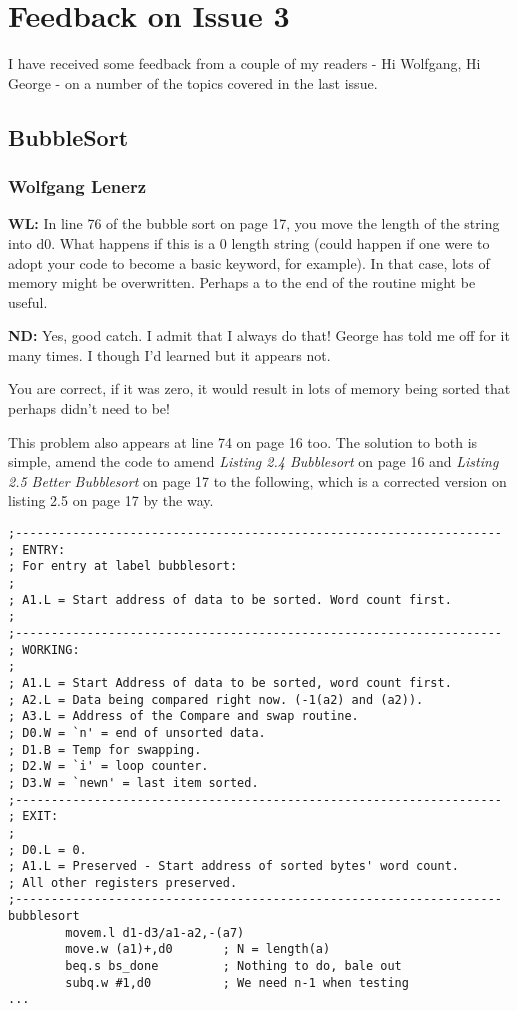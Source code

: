 \chapter{Feedback on Issue 3}
I have received some feedback from a couple of my readers - Hi Wolfgang, Hi George - on a number of the topics covered in the last issue.

\section{BubbleSort}

\subsection{Wolfgang Lenerz}

\textbf{WL: }In line 76 of the bubble sort on page 17, you move the length of the string into d0. What happens if this is a 0 length string (could happen
if one were to adopt your code to become a basic keyword, for example). In that case, lots of memory might be overwritten. Perhaps a  to the
end of the routine might be useful.

\textbf{ND: }Yes, good catch. I admit that I always do that! George has told me off for it many times. I though I'd learned but it appears not.

You are correct, if it was zero, it would result in lots of memory being sorted that perhaps didn't need to be!

This problem also appears at line 74 on page 16 too. The solution to both is simple, amend the code to amend \emph{Listing 2.4 Bubblesort} on page 16 and \emph{Listing 2.5 Better Bubblesort} on page 17 to the following, which is a corrected version on listing 2.5 on page 17 by the way.

\begin{lstlisting}[firstnumber=51,caption={Better Bubblesort - Bug Fix 1a}]
;--------------------------------------------------------------------
; ENTRY:
; For entry at label bubblesort:
;
; A1.L = Start address of data to be sorted. Word count first.
;
;--------------------------------------------------------------------
; WORKING:
;
; A1.L = Start Address of data to be sorted, word count first.
; A2.L = Data being compared right now. (-1(a2) and (a2)).
; A3.L = Address of the Compare and swap routine.
; D0.W = `n' = end of unsorted data.
; D1.B = Temp for swapping.
; D2.W = `i' = loop counter.
; D3.W = `newn' = last item sorted.
;--------------------------------------------------------------------
; EXIT:
;
; D0.L = 0.
; A1.L = Preserved - Start address of sorted bytes' word count.
; All other registers preserved.
;--------------------------------------------------------------------
bubblesort
        movem.l d1-d3/a1-a2,-(a7)
        move.w (a1)+,d0       ; N = length(a)
        beq.s bs_done         ; Nothing to do, bale out
        subq.w #1,d0          ; We need n-1 when testing
...
\end{lstlisting}

